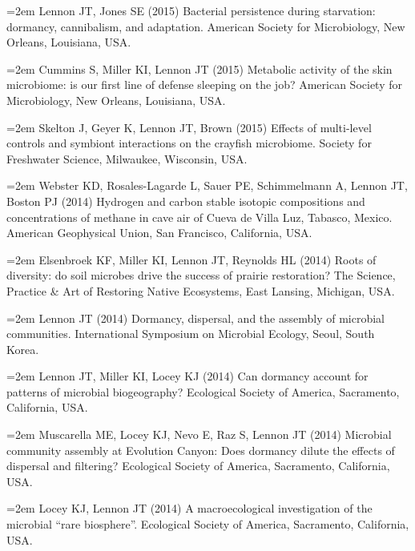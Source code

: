 \documentclass[11pt]{article}
\begin{document}
{\hangindent=2em Lennon JT, Jones SE (2015) Bacterial persistence during starvation: dormancy, cannibalism, and adaptation. American Society for Microbiology, New Orleans, Louisiana, USA. \par

\hangindent=2em Cummins S, Miller KI, Lennon JT (2015) Metabolic activity of the skin microbiome: is our first line of defense sleeping on the job? American Society for Microbiology, New Orleans, Louisiana, USA. \par

\hangindent=2em Skelton J, Geyer K, Lennon JT, Brown (2015) Effects of multi-level controls and symbiont interactions on the crayfish microbiome. Society for Freshwater Science, Milwaukee, Wisconsin, USA. \par

\hangindent=2em Webster KD, Rosales-Lagarde L, Sauer PE, Schimmelmann A, Lennon JT, Boston PJ (2014) Hydrogen and carbon stable isotopic compositions and concentrations of methane in cave air of Cueva de Villa Luz, Tabasco, Mexico. American Geophysical Union, San Francisco, California, USA. \par

\hangindent=2em Elsenbroek KF, Miller KI, Lennon JT, Reynolds HL (2014) Roots of diversity: do soil microbes drive the success of prairie restoration? The Science, Practice \& Art of Restoring Native Ecosystems, East Lansing, Michigan, USA. \par

\hangindent=2em Lennon JT (2014) Dormancy, dispersal, and the assembly of microbial communities. International Symposium on Microbial Ecology, Seoul, South Korea. \par

\hangindent=2em Lennon JT, Miller KI, Locey KJ (2014) Can dormancy account for patterns of microbial biogeography? Ecological Society of America, Sacramento, California, USA. \par

\hangindent=2em Muscarella ME, Locey KJ, Nevo E, Raz S, Lennon JT (2014) Microbial community assembly at Evolution Canyon: Does dormancy dilute the effects of dispersal and filtering? Ecological Society of America, Sacramento, California, USA. \par

\hangindent=2em Locey KJ, Lennon JT (2014) A macroecological investigation of the microbial “rare biosphere”. Ecological Society of America, Sacramento, California, USA. \par

}
\end{document}
